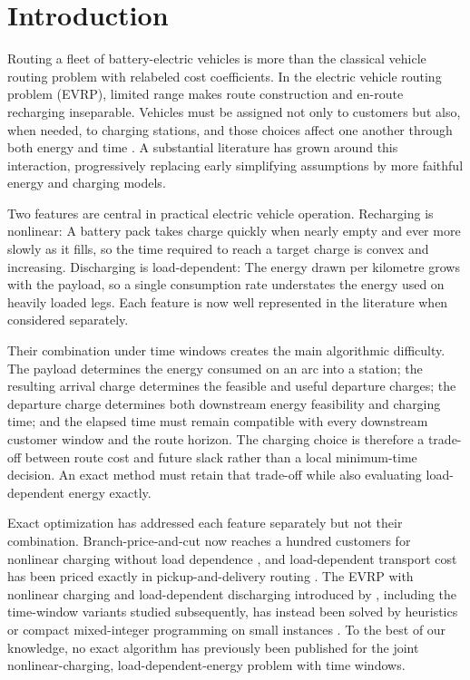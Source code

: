 \documentclass[review,3p,authoryear]{elsarticle}
\theoremstyle{plain}
\theoremstyle{definition}
\theoremstyle{remark}
\begin{document}
\section{Introduction}
\label{sec:intro}

Routing a fleet of battery-electric vehicles is more than the classical vehicle
routing problem with relabeled cost coefficients. In the electric vehicle routing
problem (EVRP), limited range makes route construction and en-route recharging
inseparable. Vehicles must
be assigned not only to customers but also, when needed, to charging stations, and
those choices affect one another through both energy and time
\citep{SchneiderStengerGoeke2014}. A substantial literature has grown around this
interaction, progressively replacing early simplifying assumptions by more faithful
energy and charging models.

Two features are central in practical electric vehicle operation. Recharging is
nonlinear: A battery pack takes charge quickly when nearly empty and ever
more slowly as it fills, so the time required to reach a target charge is convex
and increasing. Discharging is load-dependent: The energy drawn per
kilometre grows with the payload, so a single consumption rate understates the
energy used on heavily loaded legs. Each feature is now well represented in the
literature when considered separately.

Their combination under time windows creates the main algorithmic difficulty. The
payload determines the energy consumed on an arc into a station; the resulting
arrival charge determines the feasible and useful departure charges; the departure
charge determines both downstream energy feasibility and charging time; and the
elapsed time must remain compatible with every downstream customer window and the
route horizon. The charging choice is therefore a trade-off between route cost and
future slack rather than a local minimum-time decision. An exact method must retain
that trade-off while also evaluating load-dependent energy exactly.

Exact optimization has addressed each feature separately but not their combination.
Branch-price-and-cut now reaches a hundred customers for nonlinear charging without
load dependence \citep{Nafstad2025,Lam2022}, and load-dependent transport
cost has been priced exactly in pickup-and-delivery routing
\citep{HasseIrnich2025}. The EVRP with nonlinear charging and
load-dependent discharging introduced by \citet{KancharlaRamadurai2020}, including
the time-window variants studied subsequently, has instead been solved by
heuristics or compact mixed-integer programming on small instances
\citep{KancharlaRamadurai2020,Xu2022,RastaniCatay2023,Yoshida2026}. To the best of
our knowledge, no exact algorithm has previously been published for the joint
nonlinear-charging, load-dependent-energy problem with time windows.
\end{document}
